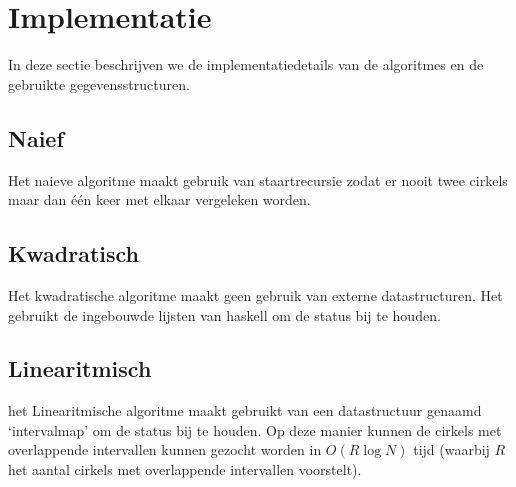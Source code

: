 \section{Implementatie}
In deze sectie beschrijven we de implementatiedetails van de algoritmes en de gebruikte gegevensstructuren.

\subsection{Naief}
Het naieve algoritme maakt gebruik van staartrecursie zodat er nooit twee cirkels maar dan \'e\'en keer met elkaar vergeleken worden.

\subsection{Kwadratisch}
Het kwadratische algoritme maakt geen gebruik van externe datastructuren. Het gebruikt de ingebouwde lijsten van haskell om de status bij te houden.


\subsection{Linearitmisch}
het Linearitmische algoritme maakt gebruikt van een datastructuur genaamd `intervalmap' om de status bij te houden.
Op deze manier kunnen de cirkels met overlappende intervallen kunnen gezocht worden in $O(R\log N)$ tijd (waarbij $R$ het aantal cirkels met overlappende intervallen voorstelt).